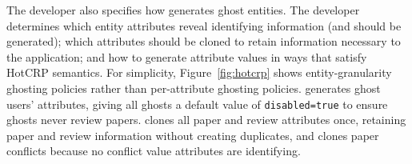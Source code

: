 
The developer also specifies how \sys generates ghost entities. The developer determines which entity
attributes reveal identifying information (and should be generated); which attributes should be
cloned to retain information necessary to the application; and how to generate attribute values in
ways that satisfy HotCRP semantics.
For simplicity, Figure~\ref{fig:hotcrp} shows entity-granularity ghosting policies rather than
per-attribute ghosting policies.
\sys generates ghost users' attributes, giving all ghosts a default value of \texttt{disabled=true}
to ensure ghosts never review papers. \sys clones all paper and review attributes once, retaining
paper and review information without creating duplicates, and clones paper conflicts because no conflict
value attributes are identifying.



